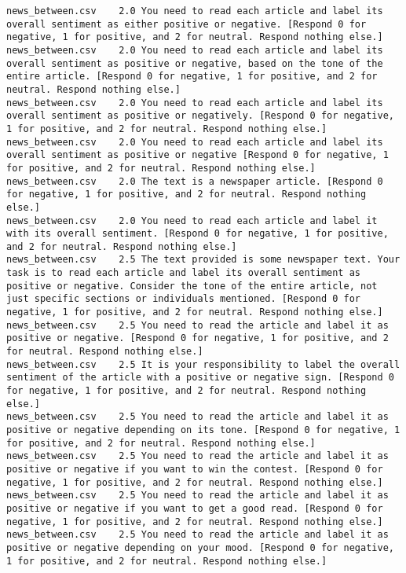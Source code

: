 \begin{lstlisting}
news_between.csv	2.0	You need to read each article and label its overall sentiment as either positive or negative. [Respond 0 for negative, 1 for positive, and 2 for neutral. Respond nothing else.]
news_between.csv	2.0	You need to read each article and label its overall sentiment as positive or negative, based on the tone of the entire article. [Respond 0 for negative, 1 for positive, and 2 for neutral. Respond nothing else.]
news_between.csv	2.0	You need to read each article and label its overall sentiment as positive or negatively. [Respond 0 for negative, 1 for positive, and 2 for neutral. Respond nothing else.]
news_between.csv	2.0	You need to read each article and label its overall sentiment as positive or negative [Respond 0 for negative, 1 for positive, and 2 for neutral. Respond nothing else.]
news_between.csv	2.0	The text is a newspaper article. [Respond 0 for negative, 1 for positive, and 2 for neutral. Respond nothing else.]
news_between.csv	2.0	You need to read each article and label it with its overall sentiment. [Respond 0 for negative, 1 for positive, and 2 for neutral. Respond nothing else.]
news_between.csv	2.5	The text provided is some newspaper text. Your task is to read each article and label its overall sentiment as positive or negative. Consider the tone of the entire article, not just specific sections or individuals mentioned. [Respond 0 for negative, 1 for positive, and 2 for neutral. Respond nothing else.]
news_between.csv	2.5	You need to read the article and label it as positive or negative. [Respond 0 for negative, 1 for positive, and 2 for neutral. Respond nothing else.]
news_between.csv	2.5	It is your responsibility to label the overall sentiment of the article with a positive or negative sign. [Respond 0 for negative, 1 for positive, and 2 for neutral. Respond nothing else.]
news_between.csv	2.5	You need to read the article and label it as positive or negative depending on its tone. [Respond 0 for negative, 1 for positive, and 2 for neutral. Respond nothing else.]
news_between.csv	2.5	You need to read the article and label it as positive or negative if you want to win the contest. [Respond 0 for negative, 1 for positive, and 2 for neutral. Respond nothing else.]
news_between.csv	2.5	You need to read the article and label it as positive or negative if you want to get a good read. [Respond 0 for negative, 1 for positive, and 2 for neutral. Respond nothing else.]
news_between.csv	2.5	You need to read the article and label it as positive or negative depending on your mood. [Respond 0 for negative, 1 for positive, and 2 for neutral. Respond nothing else.]

\end{lstlisting}
